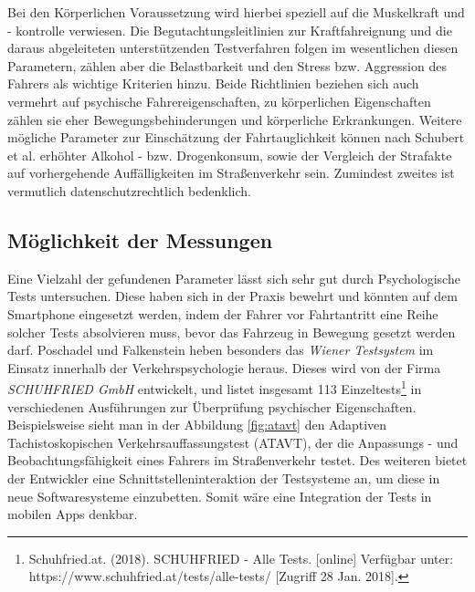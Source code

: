 Bei den Körperlichen Voraussetzung wird hierbei speziell auf die Muskelkraft und - kontrolle verwiesen. Die Begutachtungsleitlinien zur Kraftfahreignung \cite{begutachtungsrichtlinien} und die daraus abgeleiteten unterstützenden Testverfahren \cite{testverfahrenpsychometrischefahreignung} folgen im wesentlichen diesen Parametern, zählen aber die Belastbarkeit und den Stress bzw. Aggression des Fahrers als wichtige Kriterien hinzu. Beide Richtlinien beziehen sich auch vermehrt auf psychische Fahrereigenschaften, zu körperlichen Eigenschaften zählen sie eher Bewegungsbehinderungen und körperliche Erkrankungen. Weitere mögliche Parameter zur Einschätzung der Fahrtauglichkeit können nach Schubert et al. \cite{beurteilungskriterien} erhöhter Alkohol - bzw. Drogenkonsum, sowie der Vergleich der Strafakte auf vorhergehende Auffälligkeiten im Straßenverkehr sein. Zumindest zweites ist vermutlich datenschutzrechtlich bedenklich.

\subsection{Möglichkeit der Messungen}
Eine Vielzahl der gefundenen Parameter lässt sich sehr gut durch Psychologische Tests untersuchen. Diese haben sich in der Praxis bewehrt und könnten auf dem Smartphone eingesetzt werden, indem der Fahrer vor Fahrtantritt eine Reihe solcher Tests absolvieren muss, bevor das Fahrzeug in Bewegung gesetzt werden darf. Poschadel und Falkenstein \cite{testverfahrenpsychometrischefahreignung} heben besonders das \textit{Wiener Testsystem} im Einsatz innerhalb der Verkehrspsychologie heraus. Dieses wird von der Firma \textit{SCHUHFRIED GmbH} entwickelt, und listet insgesamt 113 Einzeltests\footnote{\label{foot:schuhfriedtests} Schuhfried.at. (2018). SCHUHFRIED - Alle Tests. [online] Verfügbar unter: https://www.schuhfried.at/tests/alle-tests/ [Zugriff 28 Jan. 2018].} in verschiedenen Ausführungen zur Überprüfung psychischer Eigenschaften. Beispielsweise sieht man in der Abbildung \ref{fig:atavt} den Adaptiven Tachistoskopischen Verkehrsauffassungstest (ATAVT), der die Anpassungs - und Beobachtungsfähigkeit eines Fahrers im Straßenverkehr testet. Des weiteren bietet der Entwickler eine Schnittstelleninteraktion der Testsysteme an, um diese in neue Softwaresysteme einzubetten. Somit wäre eine Integration der Tests in mobilen Apps denkbar.

